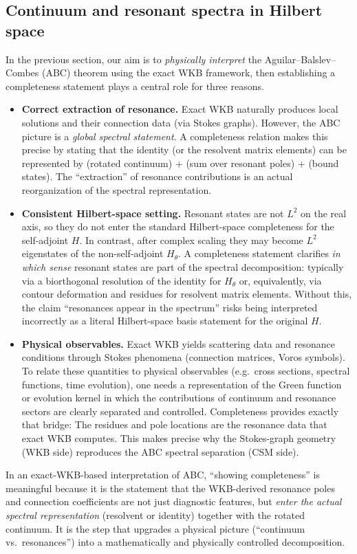 \subsection{Continuum and resonant spectra in Hilbert space}
In the previous section, our aim is to \textit{physically interpret} the Aguilar--Balslev--Combes (ABC) theorem using the exact WKB framework,
then establishing a completeness statement plays a central role for three reasons.
\begin{itemize}
\item \textbf{Correct extraction of resonance.}
Exact WKB naturally produces local solutions and their connection data (via Stokes graphs).
However, the ABC picture is a \textit{global spectral statement}.
A completeness relation makes this precise by stating that the identity (or the resolvent matrix elements) can be represented by
(rotated continuum) + (sum over resonant poles) + (bound states).
The ``extraction'' of resonance contributions is an actual reorganization of the spectral representation.
\item \textbf{Consistent Hilbert-space setting.}
Resonant states are not $L^2$ on the real axis, so they do not enter the standard Hilbert-space completeness for the self-adjoint $H$.
In contrast, after complex scaling they may become $L^2$ eigenstates of the non-self-adjoint $H_\theta$.
A completeness statement clarifies \textit{in which sense} resonant states are part of the spectral decomposition:
typically via a biorthogonal resolution of the identity for $H_\theta$ or, equivalently, via contour deformation and residues for resolvent matrix elements.
Without this, the claim ``resonances appear in the spectrum'' risks being interpreted incorrectly as a literal
Hilbert-space basis statement for the original $H$.
\item \textbf{Physical observables.}
Exact WKB yields scattering data and resonance conditions through Stokes phenomena (connection matrices, Voros symbols).
To relate these quantities to physical observables (e.g.\ cross sections, spectral functions, time evolution),
one needs a representation of the Green function or evolution kernel in which the contributions of continuum and resonance sectors are clearly separated and controlled.
Completeness provides exactly that bridge: The residues and pole locations are the resonance data that exact WKB computes.
This makes precise why the Stokes-graph geometry (WKB side) reproduces the ABC spectral separation (CSM side).
\end{itemize}
In an exact-WKB-based interpretation of ABC, ``showing completeness'' is meaningful because it is the statement
that the WKB-derived resonance poles and connection coefficients are not just diagnostic features, but
\textit{enter the actual spectral representation} (resolvent or identity) together with the rotated continuum.
It is the step that upgrades a physical picture (``continuum vs.\ resonances'') into a mathematically and physically controlled decomposition.

